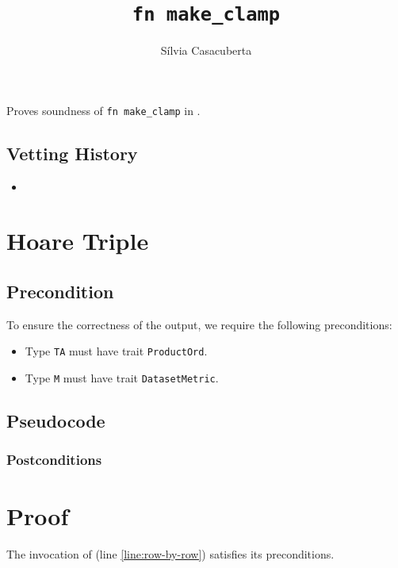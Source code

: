 \documentclass{article}
\title{\texttt{fn make\_clamp}}
\author{S\'ilvia Casacuberta}
\date{}
\begin{document}
\maketitle

\contrib
Proves soundness of \texttt{fn make\_clamp} in .

\subsection*{Vetting History}
\begin{itemize}
    \item {}
\end{itemize}

\section{Hoare Triple}
\subsection*{Precondition}
To ensure the correctness of the output, we require the following preconditions:

\begin{itemize}
    \item Type \texttt{TA} must have trait \texttt{ProductOrd}.
    \item Type \texttt{M} must have trait \texttt{DatasetMetric}.
\end{itemize}

\subsection*{Pseudocode}


\subsubsection*{Postconditions}

\section{Proof}

\begin{lemma}
    The invocation of  (line \ref{line:row-by-row}) satisfies its preconditions.
\end{lemma}
\end{document}
